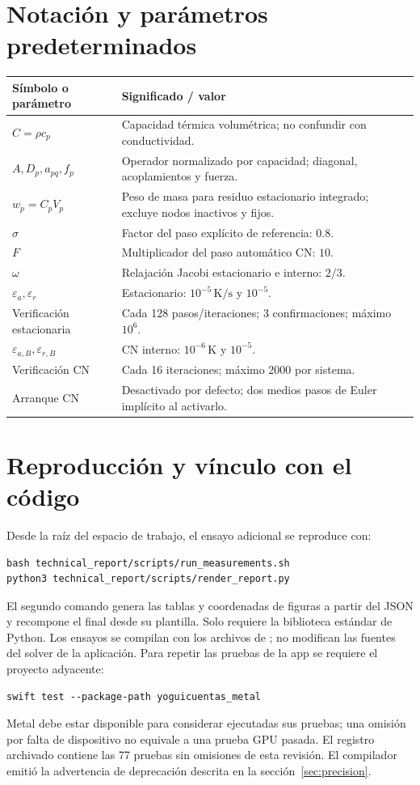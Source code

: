 \documentclass[11pt,a4paper]{article}
\newcommand{\code}[1]{\texttt{\detokenize{#1}}}
\begin{document}
\clearpage
\appendix
\section{Notación y parámetros predeterminados}
\begin{longtable}{@{}p{.24\linewidth}p{.68\linewidth}@{}}\toprule
Símbolo o parámetro & Significado / valor\\\midrule\endhead
$C=\rho c_p$ & Capacidad térmica volumétrica; no confundir con conductividad.\\
$A,D_p,a_{pq},f_p$ & Operador normalizado por capacidad; diagonal, acoplamientos y fuerza.\\
$w_p=C_pV_p$ & Peso de masa para residuo estacionario integrado; excluye nodos inactivos y fijos.\\
$\sigma$ & Factor del paso explícito de referencia: $0.8$.\\
$F$ & Multiplicador del paso automático CN: $10$.\\
$\omega$ & Relajación Jacobi estacionario e interno: $2/3$.\\
$\varepsilon_a,\varepsilon_r$ & Estacionario: $10^{-5}\,\mathrm{K/s}$ y $10^{-5}$.\\
Verificación estacionaria & Cada 128 pasos/iteraciones; 3 confirmaciones; máximo $10^6$.\\
$\varepsilon_{a,B},\varepsilon_{r,B}$ & CN interno: $10^{-6}\,\mathrm K$ y $10^{-5}$.\\
Verificación CN & Cada 16 iteraciones; máximo 2000 por sistema.\\
Arranque CN & Desactivado por defecto; dos medios pasos de Euler implícito al activarlo.\\
\bottomrule\end{longtable}

\section{Reproducción y vínculo con el código}
\label{app:reproduce}
Desde la raíz del espacio de trabajo, el ensayo adicional se reproduce con:
\begin{verbatim}
bash technical_report/scripts/run_measurements.sh
python3 technical_report/scripts/render_report.py
\end{verbatim}
El segundo comando genera las tablas y coordenadas de figuras a partir del
JSON y recompone el \code{.tex} final desde su plantilla. Solo requiere la
biblioteca estándar de Python. Los ensayos se compilan con los archivos de
\code{source_snapshot/}; no modifican las fuentes del solver de la aplicación.
Para repetir las pruebas de la app se requiere el proyecto adyacente:
\begin{verbatim}
swift test --package-path yoguicuentas_metal
\end{verbatim}
Metal debe estar disponible para considerar ejecutadas sus pruebas; una
omisión por falta de dispositivo no equivale a una prueba GPU pasada. El
registro archivado contiene las 77 pruebas sin omisiones de esta revisión.
El compilador emitió la advertencia de deprecación descrita en
la sección~\ref{sec:precision}.
\end{document}
